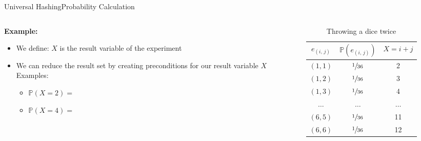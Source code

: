 \begin{frame}{Universal Hashing}{Probability Calculation}
  \begin{columns}
    \begin{column}{0.55\linewidth}
      \textbf{Example:}
      \begin{itemize}
        \item
          We define: $X$ is the result variable of the experiment
        \item
          We can reduce the result set by creating preconditions for our
          result variable $X$\\[0.5em]
          Examples:
          \begin{itemize}
            \item
              $\mathbb{P}(X = 2) = $
            \item
              $\mathbb{P}(X = 4) = $
          \end{itemize}
      \end{itemize}
    \end{column}
    \begin{column}{0.45\linewidth}
      \begin{table}[!h]
        \caption{Throwing a dice twice}
        \label{tab:probabilities:rolling_dice_twice2}
        \begin{tabularx}{0.95\linewidth}{c|cc}
          $e_{(i,\,j)}$ & $\mathbb{P}(e_{(i,\,j)})$ & $X = i + j$\\
          \midrule
          $(1, 1)$ & $\sfrac{1}{36}$ & 2\\
          $(1, 2)$ & $\sfrac{1}{36}$ & 3\\
          $(1, 3)$ & $\sfrac{1}{36}$ & 4\\
          $\dots$ & $\dots$ & $\dots$\\
          $(6, 5)$ & $\sfrac{1}{36}$ & 11\\
          $(6, 6)$ & $\sfrac{1}{36}$ & 12\\
        \end{tabularx}
      \end{table}
    \end{column}
  \end{columns}
\end{frame}


